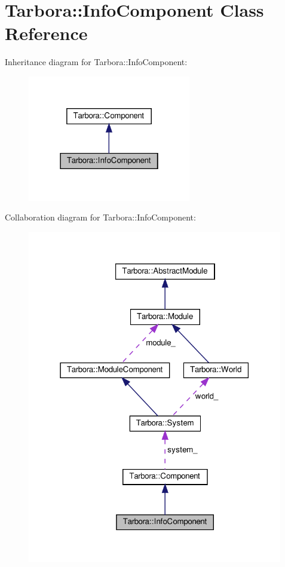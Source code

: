 \hypertarget{classTarbora_1_1InfoComponent}{}\section{Tarbora\+:\+:Info\+Component Class Reference}
\label{classTarbora_1_1InfoComponent}


Inheritance diagram for Tarbora\+:\+:Info\+Component\+:
\nopagebreak
\begin{figure}[H]
\begin{center}
\leavevmode
\includegraphics[width=202pt]{classTarbora_1_1InfoComponent__inherit__graph}
\end{center}
\end{figure}


Collaboration diagram for Tarbora\+:\+:Info\+Component\+:
\nopagebreak
\begin{figure}[H]
\begin{center}
\leavevmode
\includegraphics[width=316pt]{classTarbora_1_1InfoComponent__coll__graph}
\end{center}
\end{figure}
